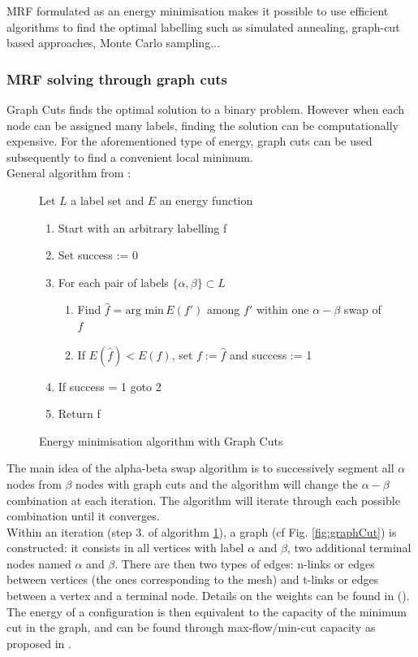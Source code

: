 \documentclass{kththesis}
\begin{document}
MRF formulated as an energy minimisation makes it possible to use efficient algorithms to find the optimal labelling such as simulated annealing, graph-cut based approaches, Monte Carlo sampling... 
\subsubsection{MRF solving through graph cuts}
Graph Cuts finds the optimal solution to a binary problem. However when each node can be assigned many labels, finding the solution can be computationally expensive. For the aforementioned type of energy,  graph cuts can be used subsequently to find a convenient local minimum. \\
General algorithm from \textcite{BoykovEnergyMinim}: 
\begin{figure}[H]
    Let $L$ a label set and $E$ an energy function
    \begin{enumerate}
        \item Start with an arbitrary labelling f
        \item Set success := 0
        \item For each pair of labels $\{\alpha, \beta\}\subset L$
        \begin{enumerate}
            \item Find  $\hat{f} = \text{arg  min} \, E(f')$ among $f'$ within
one $\alpha-\beta$ swap of $f$ 
            \item If $E( \hat{f}) < E(f)$, set $f := \hat{f}$ and success := 1
        \end{enumerate}
        \item If success = 1 goto 2
        \item Return f
    
    \end{enumerate}
    \caption{Energy minimisation algorithm with Graph Cuts}
    \label{fig:minim_energy}
\end{figure}


The main idea of the alpha-beta swap algorithm is to successively segment all $\alpha$ nodes from $\beta$ nodes with graph cuts and the algorithm will change the $\alpha-\beta$ combination at each iteration. The algorithm will iterate through each possible combination until it converges. \\
Within an iteration (step 3. of algorithm \ref{fig:minim_energy}), a graph (cf Fig. \ref{fig:graphCut}) is constructed: it consists in all vertices with label $\alpha$ and $\beta$, two additional terminal nodes named $\alpha$ and $\beta$. There are then two types of edges: n-links or edges between vertices (the ones corresponding to the mesh) and t-links or edges between a vertex and a terminal node. Details on the weights can be found in (\textcite{BoykovEnergyMinim}). \\
The energy of a configuration is then equivalent to the capacity of the minimum cut in the graph, and can be found through max-flow/min-cut capacity as proposed in \textcite{KolmogorovMaxflow}. \\
\end{document}
